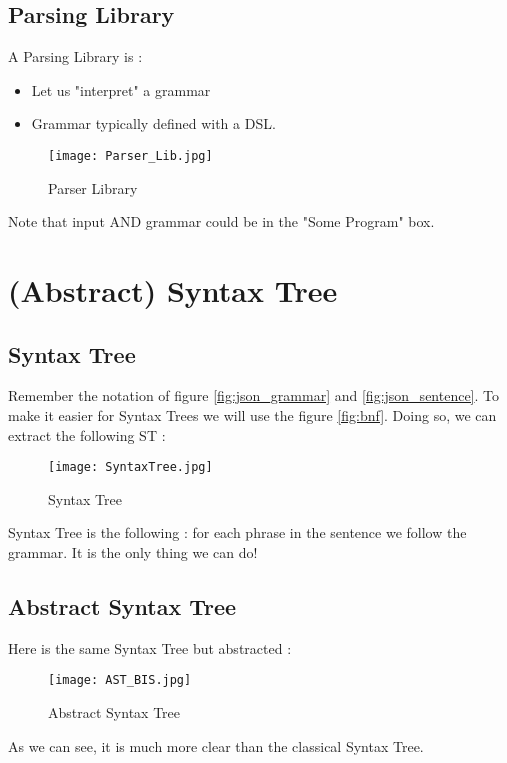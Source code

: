         \subsection{Parsing Library}
            \theoremstyle{definition}
            \begin{definition}
                A Parsing Library is : 
                \begin{itemize}
                    \item Let us "interpret" a grammar
                    \item Grammar typically defined with a DSL.
                \end{itemize}
            \end{definition}
            \begin{figure}[H]
                 \centering
                 \texttt{[image: Parser\_Lib.jpg]}
                 \caption{Parser Library}
                 \label{fig:parser_lib}
            \end{figure}
            Note that input AND grammar could be in the "Some Program" box.
    \section{(Abstract) Syntax Tree}
        \subsection{Syntax Tree}
            Remember the notation of figure \ref{fig:json_grammar} and
            \ref{fig:json_sentence}. To make it easier for Syntax Trees we will use
            the figure \ref{fig:bnf}. Doing so, we can extract the following ST : 
            \begin{figure}[H]
                \centering
                \texttt{[image: SyntaxTree.jpg]}
                \caption{Syntax Tree}
                \label{fig:syntax_tree}
            \end{figure}
            Syntax Tree is the following : for each phrase in the sentence we follow
            the grammar. It is the only thing we can do!
        \subsection{Abstract Syntax Tree}
            Here is the same Syntax Tree but abstracted : 
            \begin{figure}[H]
                 \centering
                 \texttt{[image: AST\_BIS.jpg]}
                 \caption{Abstract Syntax Tree}
                 \label{fig:ast_bis}
            \end{figure}
            As we can see, it is much more clear than the classical Syntax Tree.

